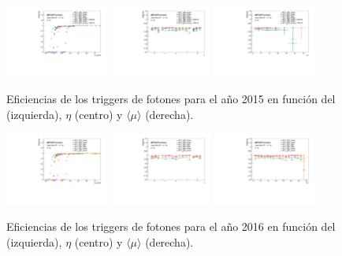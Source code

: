 \begin{figure}[!htpb]
  \centering
      {\includegraphics[width=0.30\textwidth]{images/trigger/2015_eff_et.pdf}}
      {\includegraphics[width=0.30\textwidth]{images/trigger/2015_eff_eta_zoom.pdf}}
      {\includegraphics[width=0.30\textwidth]{images/trigger/2015_eff_mu_zoom.pdf}}
      \caption{Eficiencias de los triggers de fotones para el año 2015 en función del \ET (izquierda), $\eta$ (centro) y $\langle\mu\rangle$ (derecha).}
      \label{fig:photon_trig_eff_2015}
\end{figure}
\begin{figure}[!htpb]
  \centering
      {\includegraphics[width=0.30\textwidth]{images/trigger/2016_eff_et.pdf}}
      {\includegraphics[width=0.30\textwidth]{images/trigger/2016_eff_eta_zoom.pdf}}
      {\includegraphics[width=0.30\textwidth]{images/trigger/2016_eff_mu_zoom.pdf}}
      \caption{Eficiencias de los triggers de fotones para el año 2016 en función del \ET (izquierda), $\eta$ (centro) y $\langle\mu\rangle$ (derecha).}
      \label{fig:photon_trig_eff_2016}
\end{figure}
